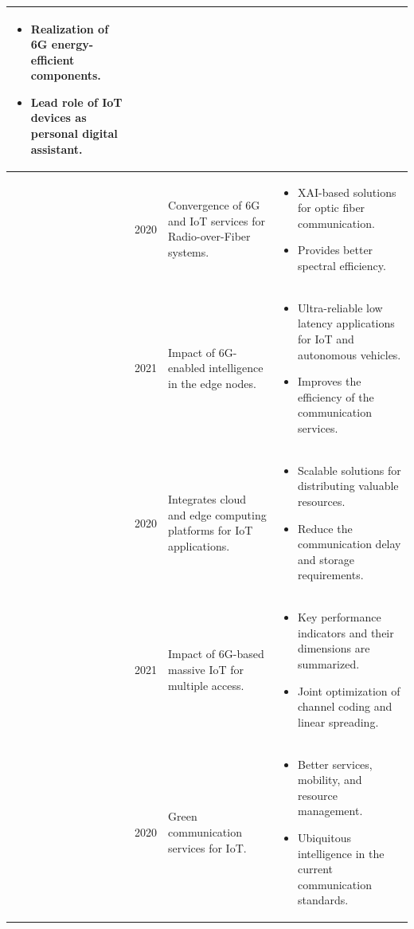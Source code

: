 \documentclass[journal]{IEEEtran}
\begin{document}
\begin{table}[!ht]
\begin{tabular}{|p{0.75cm}|p{0.5cm}|p{6.0cm}|p{9.0cm}|}
\begin{itemize}
    \item Realization of 6G energy-efficient components.
    \item Lead role of IoT devices as personal digital assistant.
\end{itemize}
\\ \hline
\cite{chen2020towards}  & 2020 & Convergence of 6G and IoT services for Radio-over-Fiber systems. &  
\begin{itemize}
    \item XAI-based solutions for optic fiber communication.
    \item Provides better spectral efficiency.
\end{itemize}
\\ \hline
\cite{gupta20216g}  & 2021 & Impact of 6G-enabled intelligence in the edge nodes. &  
\begin{itemize}
    \item Ultra-reliable low latency applications for IoT and autonomous vehicles.
    \item Improves the efficiency of the communication services.
\end{itemize}
\\ \hline
\cite{wu2020cloud}  & 2020 & Integrates cloud and edge computing platforms for IoT applications. &  
\begin{itemize}
    \item Scalable solutions for distributing valuable resources.
    \item Reduce the communication delay and storage requirements.
\end{itemize}
\\ \hline
\cite{yuan2021noma}  & 2021 & Impact of 6G-based massive IoT for multiple access. &  
\begin{itemize}
    \item Key performance indicators and their dimensions are summarized.
    \item Joint optimization of channel coding and linear spreading. 
\end{itemize}
\\ \hline
\cite{niu2020green}  & 2020 & Green communication services for IoT.  &  
\begin{itemize}
    \item Better services, mobility, and resource management.
    \item Ubiquitous intelligence in the current communication standards.
\end{itemize}
\\ \hline
\end{tabular}
\end{table}
\end{document}
